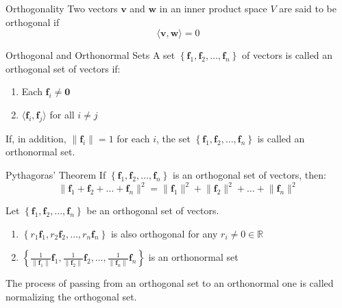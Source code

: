 \documentclass[12pt]{article}
\begin{document}
\begin{definition}{Orthogonality}{}
    Two vectors $ \mathbf{v} $ and $ \mathbf{w} $ in an inner product space $ V $ are said to be orthogonal if
    \[ \langle \mathbf{v}, \mathbf{w} \rangle = 0 \]
\end{definition}

\begin{definition}{Orthogonal and Orthonormal Sets}{}
    A set $ \left\{ \mathbf{f}_1, \mathbf{f}_2, \dots, \mathbf{f}_n \right\} $ of vectors is called an orthogonal set of vectors if:
    \begin{enumerate}[label=(\roman*)]
        \item Each $ \mathbf{f}_i \neq \mathbf{0} $
        \item $ \langle \mathbf{f}_i, \mathbf{f}_j \rangle $ for all $ i \neq j $
    \end{enumerate}
    If, in addition, $ \lVert \mathbf{f}_i \rVert = 1 $ for each $ i $, the set $ \left\{ \mathbf{f}_1, \mathbf{f}_2, \dots, \mathbf{f}_n \right\} $ is called an orthonormal set.
\end{definition}

\begin{theorem}{Pythagoras' Theorem}{}
    If $ \left\{ \mathbf{f}_1, \mathbf{f}_2, \dots, \mathbf{f}_n \right\} $ is an orthogonal set of vectors, then:
    \[ \lVert \mathbf{f}_1 + \mathbf{f}_2 + \dots + \mathbf{f}_n \rVert^2 = \lVert \mathbf{f}_1 \rVert^2 + \lVert \mathbf{f}_2 \rVert^2 + \dots + \lVert \mathbf{f}_n \rVert^2 \]
\end{theorem}

\begin{theorem}{}{}
    Let $ \left\{ \mathbf{f}_1, \mathbf{f}_2, \dots, \mathbf{f}_n \right\} $ be an orthogonal set of vectors.
    \begin{enumerate}[label=(\roman*)]
        \item $ \left\{ r_1 \mathbf{f}_1, r_2 \mathbf{f}_2, \dots, r_n \mathbf{f}_n \right\} $ is also orthogonal for any $ r_i \neq 0 \in \mathbb{R} $
        \item $ \left\{ \frac{1}{\lVert \mathbf{f}_1 \rVert} \mathbf{f}_1, \frac{1}{\lVert \mathbf{f}_2 \rVert} \mathbf{f}_2, \dots, \frac{1}{\lVert \mathbf{f}_n \rVert} \mathbf{f}_n \right\} $ is an orthonormal set
    \end{enumerate}
    The process of passing from an orthogonal set to an orthonormal one is called normalizing the orthogonal set.
\end{theorem}
\end{document}
